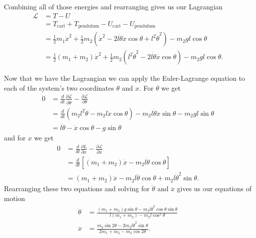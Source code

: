\documentclass{article}
\begin{document}
Combining all of those energies and rearranging gives us our Lagrangian \begin{align*}
  \mathcal{L} & = T - U                                                                                                                                     \\
              & = T_\text{cart} + T_\text{pendulum} - U_\text{cart} - U_\text{pendulum}                                                                     \\
              & = \frac{1}{2} m_1 \dot{x}^2 + \frac{1}{2} m_2 (\dot{x}^2 - 2 l \dot{\theta} \dot{x} \cos \theta + l^2 \dot{\theta}^2) - m_2 g l \cos \theta \\
              & = \frac{1}{2} (m_1 + m_2) \dot{x}^2 + \frac{1}{2} m_2 (l^2 \dot{\theta}^2 - 2 l \dot{\theta} \dot{x} \cos \theta) - m_2 g l \cos \theta.
\end{align*}

Now that we have the Lagrangian we can apply the Euler-Lagrange equation to each of the system's two coordinates $\theta$ and $x$. For $\theta$ we get \begin{align*}
  0 & = \frac{d}{d t} \frac{\partial \mathcal{L}}{\partial \dot{\theta}} - \frac{\partial \mathcal{L}}{\partial \theta}                 \\
    & = \frac{d}{d t} (m_2 l^2 \dot{\theta} - m_2 l \dot{x} \cos \theta) - m_2 l \dot{\theta} \dot{x} \sin \theta - m_2 g l \sin \theta \\
    & = l \ddot{\theta} - \ddot{x} \cos \theta - g \sin \theta
\end{align*} and for $x$ we get \begin{align*}
  0 & = \frac{d}{d t} \frac{\partial L}{\partial \dot{x}} - \frac{\partial \mathcal{L}}{\partial x} \\
    & = \frac{d}{d t} [(m_1 + m_2) \dot{x} - m_2 l \dot{\theta} \cos \theta]                        \\
    & = (m_1 + m_2) \ddot{x} - m_2 l \ddot{\theta} \cos \theta + m_2 l \dot{\theta}^2 \sin \theta.
\end{align*} Rearranging these two equations and solving for $\ddot{\theta}$ and $\ddot{x}$ gives us our equations of motion \begin{align*}
\ddot{\theta} & = \frac{(m_1 + m_2) g \sin \theta - m_2 l \dot{\theta}^2 \cos \theta \sin \theta}{l (m_1 + m_2) - m_2 l \cos^2 \theta} \\
\ddot{x}      & = \frac{m_2 \sin 2 \theta - 2 m_2 l \dot{\theta}^2 \sin \theta}{2 m_1 + m_2 - m_2 \cos 2 \theta}.
\end{align*}
\end{document}
